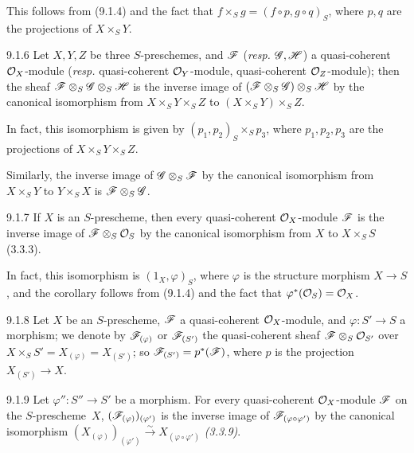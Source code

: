 \documentclass[../main.tex]{subfiles}
\begin{document}
This follows from (9.1.4) and the fact that $f\times_S g=(f\circ p, g\circ q)_S$, where $p,q$ are the projections of $X\times_S Y$.

\begin{cx}[Corollary]{9.1.6}
    Let $X,Y,Z$ be three $S$-preschemes, and $\mathscr{F}$ (\emph{resp.} $\mathscr{G},\mathscr{H}$) a quasi-coherent $\mathcal{O}_X$-module (\emph{resp.} quasi-coherent $\mathcal{O}_Y$-module, quasi-coherent $\mathcal{O}_Z$-module); then the sheaf $\mathscr{F}\otimes_S\mathscr{G}\otimes_S\mathscr{H}$ is the inverse image of $(\mathscr{F}\otimes_S\mathscr{G})\otimes_S\mathscr{H}$ by the canonical isomorphism from $X\times_S Y\times_S Z$ to $(X\times_S Y)\times_S Z$.
\end{cx}

In fact, this isomorphism is given by $(p_1,p_2)_S\times_S p_3$, where $p_1,p_2,p_3$ are the projections of $X\times_S Y\times_S Z$.

Similarly, the inverse image of $\mathscr{G}\otimes_S\mathscr{F}$ by the canonical isomorphism from $X\times_S Y$ to $Y\times_S X$ is $\mathscr{F}\otimes_S\mathscr{G}$.

\begin{cx}[Corollary]{9.1.7}
    If $X$ is an $S$-prescheme, then every quasi-coherent $\mathcal{O}_X$-module $\mathscr{F}$ is the inverse image of $\mathscr{F}\otimes_S\mathcal{O}_S$ by the canonical isomorphism from $X$ to $X\times_S S$ (3.3.3).
\end{cx}

In fact, this isomorphism is $(1_X,\varphi)_S$, where $\varphi$ is the structure morphism $X\to S$, and the corollary follows from (9.1.4) and the fact that $\varphi^*(\mathcal{O}_S)=\mathcal{O}_X$.

\begin{cx}{9.1.8}
    Let $X$ be an $S$-prescheme, $\mathscr{F}$ a quasi-coherent $\mathcal{O}_X$-module, and $\varphi\colon S'\to S$ a morphism; we denote by $\mathscr{F}_{(\varphi)}$ or $\mathscr{F}_{(S')}$ the quasi-coherent sheaf $\mathscr{F}\otimes_S\mathcal{O}_{S'}$ over $X\times_S S'=X_{(\varphi)}=X_{(S')}$; so $\mathscr{F}_{(S')}=p^*(\mathscr{F})$, where $p$ is the projection $X_{(S')}\to X$.
\end{cx}

\begin{cx}[Proposition]{9.1.9}
    Let $\varphi''\colon S''\to S'$ be a morphism.
    For every quasi-coherent $\mathcal{O}_X$-module $\mathscr{F}$ on the $S$-prescheme~$X$, $(\mathscr{F}_{(\varphi)})_{(\varphi')}$ is the inverse image of $\mathscr{F}_{(\varphi\circ\varphi')}$ by the canonical isomorphism $(X_{(\varphi)})_{(\varphi')}\xrightarrow{\sim}X_{(\varphi\circ\varphi')}$ \emph{(3.3.9)}.
\end{cx}
\end{document}
